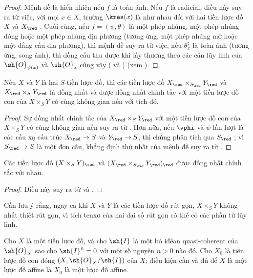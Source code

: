 \documentclass[oneside]{amsart}
\makeatletter
\newcommand{\ega@arrow}[2]{\mathchoice{#1}{#2}{#2}{#2}}
\renewcommand{\to}{\ega@arrow{\longrightarrow}{\rightarrow}}
\newcommand{\oldpage}[2][]{{\marginnote{\normalfont\textbf{#1}~|~#2}}\ignorespaces}
\let\EGAOriginalLabel\label
\renewcommand{\label}[1]{\phantomsection\EGAOriginalLabel{#1}}
\makeatother
\begin{document}
\begin{proof}
Mệnh đề là hiển nhiên nếu $f$ là toàn ánh.
Nếu $f$ là radicial, điều này suy ra từ việc, với mọi $x\in X$, trường $\kres(x)$ là như nhau đối với hai tiền lược đồ $X$ và $X_\red$ .
Cuối cùng, nếu $f=(\psi,\theta)$ là một phép nhúng, một phép nhúng đóng hoặc một phép nhúng địa phương (tương ứng, một phép nhúng mở hoặc một đẳng cấu địa phương), thì mệnh đề suy ra từ việc, nếu $\theta_x^\sharp$ là toàn ánh (tương ứng, song ánh), thì đồng cấu thu được khi lấy thương theo các căn lũy linh của $\sh{O}_{\psi(x)}$ và $\sh{O}_x$ cũng vậy ( và ) (xem ).
\end{proof}

\begin{proposition}[5.1.7]
\label{I.5.1.7}
Nếu $X$ và $Y$ là hai $S$-tiền lược đồ, thì các tiền lược đồ $X_\red\times_{S_\red}Y_\red$ và $X_\red\times_S Y_\red$ là đồng nhất và được đồng nhất chính tắc với một tiền lược đồ con của $X\times_S Y$ có cùng không gian nền với tích đó.
\end{proposition}

\begin{proof}
Sự đồng nhất chính tắc của $X_\red\times_S Y_\red$ với một tiền lược đồ con của $X\times_S Y$ có cùng không gian nền suy ra từ .
Hơn nữa, nếu $\vphi$ và $\psi$ lần lượt là các cấu xạ cấu trúc $X_\red\to S$ và $Y_\red\to S$, thì chúng phân tích qua $S_\red$ ; vì $S_\red\to S$ là một đơn cấu, khẳng định thứ nhất của mệnh đề suy ra từ .
\end{proof}

\begin{corollary}[5.1.8]
\label{I.5.1.8}
Các tiền lược đồ $(X\times_S Y)_\red$ và $(X_\red\times_{S_\red}Y_\red)_\red$ được đồng nhất chính tắc với nhau.
\end{corollary}

\begin{proof}
Điều này suy ra từ  và .
\end{proof}

Cần lưu ý rằng, ngay cả khi $X$ và $Y$ là các tiền lược đồ rút gọn, $X\times_S Y$ không nhất thiết rút gọn, vì tích tenxơ của hai đại số rút gọn có thể có các phần tử lũy linh.

\begin{proposition}[5.1.9]
\label{I.5.1.9}
\oldpage[I]{130}
Cho $X$ là một tiền lược đồ, và cho $\sh{I}$ là một bó iđêan quasi-coherent của $\sh{O}_X$ sao cho $\sh{I}^n=0$ với một số nguyên $n>0$ nào đó.
Cho $X_0$ là tiền lược đồ con đóng $(X,\sh{O}_X/\sh{I})$ của $X$;
điều kiện cần và đủ để $X$ là một lược đồ affine là $X_0$ là một lược đồ affine.
\end{proposition}
\end{document}
